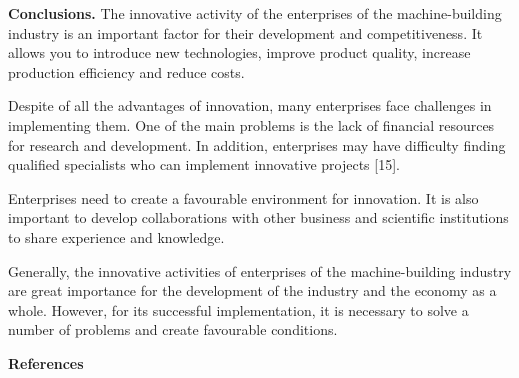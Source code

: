 \begin{multicols}{2}
{\bfseries Conclusions.} The innovative activity of the enterprises of the
machine-building industry is an important factor for their development
and competitiveness. It allows you to introduce new technologies,
improve product quality, increase production efficiency and reduce
costs.

Despite of all the advantages of innovation, many enterprises face
challenges in implementing them. One of the main problems is the lack of
financial resources for research and development. In addition,
enterprises may have difficulty finding qualified specialists who can
implement innovative projects {[}15{]}.

Enterprises need to create a favourable environment for innovation. It
is also important to develop collaborations with other business and
scientific institutions to share experience and knowledge.

Generally, the innovative activities of enterprises of the
machine-building industry are great importance for the development of
the industry and the economy as a whole. However, for its successful
implementation, it is necessary to solve a number of problems and create
favourable conditions.
\end{multicols}

\begin{center}
{\bfseries References}
\end{center}

